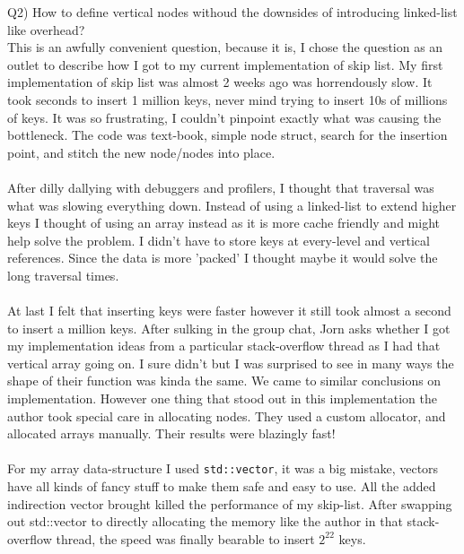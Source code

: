 \documentclass[12pt]{article}
\begin{document}
{Q2) How to define vertical nodes withoud the downsides of introducing linked-list like overhead?} \\

This is an awfully convenient question, because it is, I chose the question as an outlet to describe how I got to my current implementation of skip list. My first implementation of skip list was almost 2 weeks ago was horrendously slow. It took seconds to insert 1 million keys, never mind trying to insert 10s of millions of keys. It was so frustrating, I couldn't pinpoint exactly what was causing the bottleneck. The code was text-book, simple node struct, search for the insertion point, and stitch the new node/nodes into place.
\\\\
After dilly dallying with debuggers and profilers, I thought that traversal was what was slowing everything down. Instead of using a linked-list to extend higher keys I thought of using an array instead as it is more cache friendly and might help solve the problem. I didn't have to store keys at every-level and vertical references. Since the data is more 'packed' I thought maybe it would solve the long traversal times.
\\\\
At last I felt that inserting keys were faster however it still took almost a second to insert a million keys. After sulking in the group chat, Jorn asks whether I got my implementation ideas from a particular stack-overflow thread \cite{stack-overflow} as I had that vertical array going on. I sure didn't but I was surprised to see in many ways the shape of their function was kinda the same. We came to similar conclusions on implementation. However one thing that stood out in this implementation the author took special care in allocating nodes. They used a custom allocator, and allocated arrays manually. Their results were blazingly fast!
\\\\
For my array data-structure I used \texttt{std::vector}, it was a big mistake, vectors have all kinds of fancy stuff to make them safe and easy to use. All the added indirection vector brought killed the performance of my skip-list. After swapping out std::vector to directly allocating the memory  like the author in that stack-overflow thread, the speed was finally bearable to insert $2^{22}$ keys.
\\\\

\pagebreak
\end{document}
